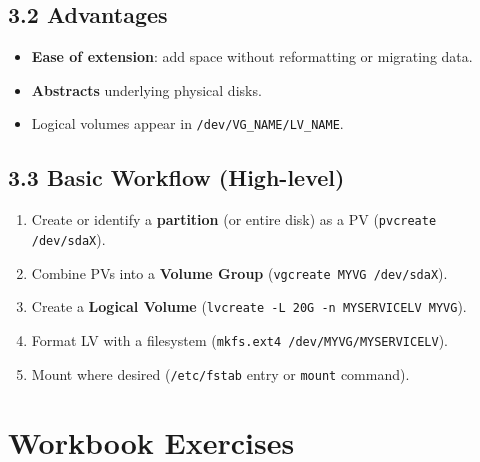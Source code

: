 \documentclass[12pt,a4paper]{report}
\begin{document}
\subsection*{3.2 Advantages}
\begin{itemize}
    \item \textbf{Ease of extension}: add space without reformatting or migrating data.  
    \item \textbf{Abstracts} underlying physical disks.  
    \item Logical volumes appear in \texttt{/dev/VG\_NAME/LV\_NAME}.
\end{itemize}

\subsection*{3.3 Basic Workflow (High-level)}
\begin{enumerate}
    \item Create or identify a \textbf{partition} (or entire disk) as a PV (\texttt{pvcreate /dev/sdaX}).  
    \item Combine PVs into a \textbf{Volume Group} (\texttt{vgcreate MYVG /dev/sdaX}).  
    \item Create a \textbf{Logical Volume} (\texttt{lvcreate -L 20G -n MYSERVICELV MYVG}).  
    \item Format LV with a filesystem (\texttt{mkfs.ext4 /dev/MYVG/MYSERVICELV}).  
    \item Mount where desired (\texttt{/etc/fstab} entry or \texttt{mount} command).
\end{enumerate}



\section*{Workbook Exercises}
\end{document}
